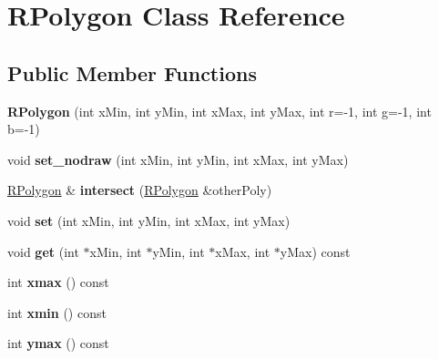 \hypertarget{classRPolygon}{}\section{R\+Polygon Class Reference}
\label{classRPolygon}
\subsection*{Public Member Functions}
\begin{DoxyCompactItemize}
\item 
\hypertarget{classRPolygon_a1144f3be02ec183e3c36a6f37110b061}{}{\bfseries R\+Polygon} (int x\+Min, int y\+Min, int x\+Max, int y\+Max, int r=-\/1, int g=-\/1, int b=-\/1)\label{classRPolygon_a1144f3be02ec183e3c36a6f37110b061}

\item 
\hypertarget{classRPolygon_ac04632d2cc72ddf514224177fc70a6aa}{}void {\bfseries set\+\_\+nodraw} (int x\+Min, int y\+Min, int x\+Max, int y\+Max)\label{classRPolygon_ac04632d2cc72ddf514224177fc70a6aa}

\item 
\hypertarget{classRPolygon_a953c09738828d141fd25363f592b9101}{}\hyperlink{classRPolygon}{R\+Polygon} \& {\bfseries intersect} (\hyperlink{classRPolygon}{R\+Polygon} \&other\+Poly)\label{classRPolygon_a953c09738828d141fd25363f592b9101}

\item 
\hypertarget{classRPolygon_a882cda46f5cd03af9cacedc5dee63ebb}{}void {\bfseries set} (int x\+Min, int y\+Min, int x\+Max, int y\+Max)\label{classRPolygon_a882cda46f5cd03af9cacedc5dee63ebb}

\item 
\hypertarget{classRPolygon_a8d3db81890120491cef1b3768f20c9d6}{}void {\bfseries get} (int $\ast$x\+Min, int $\ast$y\+Min, int $\ast$x\+Max, int $\ast$y\+Max) const \label{classRPolygon_a8d3db81890120491cef1b3768f20c9d6}

\item 
\hypertarget{classRPolygon_a852a3309d11711ecf4e0f7b434ba9666}{}int {\bfseries xmax} () const \label{classRPolygon_a852a3309d11711ecf4e0f7b434ba9666}

\item 
\hypertarget{classRPolygon_a6ec8bd2c706d4ab1afb8fb1f864f001a}{}int {\bfseries xmin} () const \label{classRPolygon_a6ec8bd2c706d4ab1afb8fb1f864f001a}

\item 
\hypertarget{classRPolygon_a400773f3664263df81fb64d9ae9678cd}{}int {\bfseries ymax} () const \label{classRPolygon_a400773f3664263df81fb64d9ae9678cd}


\end{DoxyCompactItemize}
